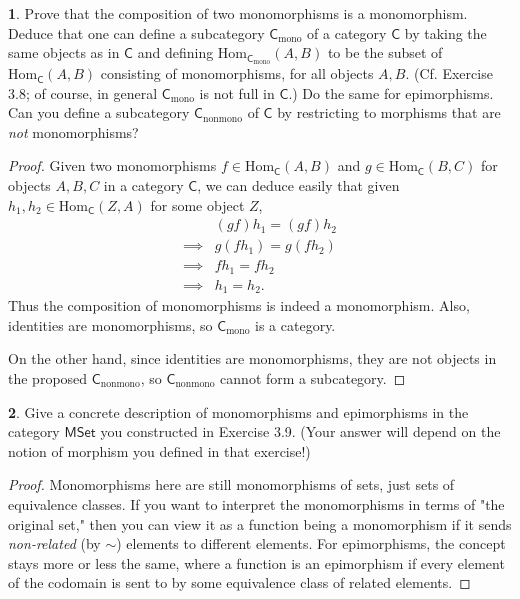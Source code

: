 \documentclass{article}
\theoremstyle{definition}
\newtheorem{ex}{}[section]
\begin{document}
\begin{ex}
	Prove that the composition of two monomorphisms is a monomorphism.
	Deduce that one can define a subcategory $\mathsf{C}_{\mathrm{mono}}$ of a category $\mathsf{C}$ by taking the same objects as in $\mathsf{C}$ and defining $\mathrm{Hom}_{\mathsf{C}_{\mathrm{mono}}}(A, B)$ to be the subset of $\mathrm{Hom}_{\mathsf{C}}(A, B)$ consisting of monomorphisms, for all objects $A, B$.
	(Cf. Exercise 3.8; of course, in general $\mathsf{C}_{\mathrm{mono}}$ is not full in $\mathsf{C}$.)
	Do the same for epimorphisms.
	Can you define a subcategory $\mathsf{C}_{\mathrm{nonmono}}$ of $\mathsf{C}$ by restricting to morphisms that are \textit{not} monomorphisms?
\end{ex}
\begin{proof}
  Given two monomorphisms $f \in \mathrm{Hom}_{\mathsf{C}}(A, B)$ and $g \in \mathrm{Hom}_{\mathsf{C}}(B, C)$ for objects $A, B, C$ in a category $\mathsf{C}$, we can deduce easily that given $h_1, h_2 \in \mathrm{Hom}_{\mathsf{C}}(Z, A)$ for some object $Z$, \begin{align*}
		         & (gf)h_1 = (gf)h_2 \\
		\implies & g(fh_1) = g(fh_2) \\
		\implies & fh_1 = fh_2       \\
		\implies & h_1 = h_2.
	\end{align*}
  Thus the composition of monomorphisms is indeed a monomorphism. 
  Also, identities are monomorphisms, so $\mathsf{C}_{\mathrm{mono}}$ is a category.

  On the other hand, since identities are monomorphisms, they are not objects in the proposed $\mathsf{C}_{\mathrm{nonmono}}$, so $\mathsf{C}_{\mathrm{nonmono}}$ cannot form a subcategory.
\end{proof}

\begin{ex}
  Give a concrete description of monomorphisms and epimorphisms in the category $\mathsf{MSet}$ you constructed in Exercise 3.9.
  (Your answer will depend on the notion of morphism you defined in that exercise!)
\end{ex}
\begin{proof}
  Monomorphisms here are still monomorphisms of sets, just sets of equivalence classes.
  If you want to interpret the monomorphisms in terms of "the original set," then you can view it as a function being a monomorphism if it sends \textit{non-related} (by $\sim$) elements to different elements.
  For epimorphisms, the concept stays more or less the same, where a function is an epimorphism if every element of the codomain is sent to by some equivalence class of related elements.
\end{proof}
\end{document}
